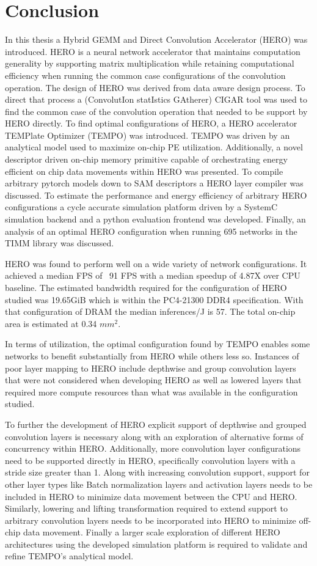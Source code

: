 \chapter{Conclusion}
\label{chap:conclude}

In this thesis a Hybrid GEMM and Direct Convolution Accelerator (HERO) was
introduced. HERO is a neural network accelerator that maintains computation
generality by supporting matrix multiplication while retaining computational
efficiency when running the common case configurations of the convolution
operation. The design of HERO was derived from data aware design process. To
direct that process a (ConvolutIon statIstics GAtherer) \ac{CIGAR} tool was used
to find the common case of the convolution operation that needed to be support
by HERO directly. To find optimal configurations of HERO, a HERO accelerator
TEMPlate Optimizer (TEMPO) was introduced. TEMPO was driven by an analytical
model used to maximize on-chip PE utilization. Additionally, a novel descriptor
driven on-chip memory primitive capable of orchestrating energy efficient on
chip data movements within \ac{HERO} was presented. To compile arbitrary pytorch
models down to SAM descriptors a HERO layer compiler was discussed. To estimate
the performance and energy efficiency of arbitrary HERO configurations a cycle
accurate simulation platform driven by a SystemC simulation backend and a python
evaluation frontend was developed. Finally, an analysis of an optimal HERO
configuration when running 695 networks in the TIMM library was discussed.

HERO was found to perform well on a wide variety of network configurations. It
achieved a median FPS of ~91 FPS with a median speedup of 4.87X over CPU
baseline. The estimated bandwidth required for the configuration of HERO studied
was 19.65GiB which is within the PC4-21300 DDR4 specification. With that
configuration of DRAM the median inferences/J is 57. The total on-chip area is
estimated at 0.34 $mm^2$. 

In terms of utilization, the optimal configuration found by TEMPO enables some
networks to benefit substantially from HERO while others less so. Instances of
poor layer mapping to HERO include depthwise and group convolution layers that
were not considered when developing HERO as well as lowered layers that required more
compute resources than what was available in the configuration studied. 

To further the development of HERO explicit support of depthwise and grouped
convolution layers is necessary along with an exploration of alternative forms
of concurrency within HERO. Additionally, more convolution layer configurations
need to be supported directly in HERO, specifically convolution layers with a
stride size greater than 1. Along with increasing convolution support, support
for other layer types like Batch normalization layers and activation layers
needs to be included in HERO to minimize data movement between the CPU and HERO.
Similarly, lowering and lifting transformation required to extend support to
arbitrary convolution layers needs to be incorporated into HERO to minimize
off-chip data movement. Finally a larger scale exploration of different HERO
architectures using the developed simulation platform is required to validate
and refine TEMPO's analytical model.